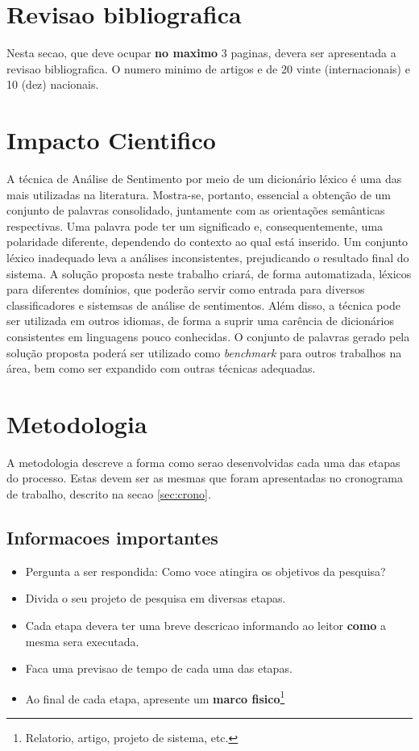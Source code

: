 \documentclass[a4paper,11pt]{article}
\begin{document}
\section{Revisao bibliografica}
Nesta secao, que deve ocupar \textbf{no maximo} 3 paginas, devera ser apresentada a revisao bibliografica. O numero minimo de artigos e de 20 vinte (internacionais) e 10 (dez) nacionais.

\section{Impacto Cientifico}
A técnica de Análise de Sentimento por meio de um dicionário léxico é uma das mais utilizadas na literatura. Mostra-se, portanto, essencial a obtenção de um conjunto de palavras consolidado, juntamente com as orientações semânticas respectivas. 
Uma palavra pode ter um significado e, consequentemente, uma polaridade diferente, dependendo do contexto ao qual está inserido. 
Um conjunto léxico inadequado leva a análises inconsistentes, prejudicando o resultado final do sistema.
A solução proposta neste trabalho criará, de forma automatizada, léxicos para diferentes domínios, que poderão servir como entrada para diversos classificadores e sistemsas de análise de sentimentos. Além disso, a técnica pode ser utilizada em outros idiomas, de forma a suprir uma carência de dicionários consistentes em linguagens pouco conhecidas.
O conjunto de palavras gerado pela solução proposta poderá ser utilizado como \emph{benchmark} para outros trabalhos na área, bem como ser expandido com outras técnicas adequadas.

\section{Metodologia}

A metodologia descreve a forma como serao desenvolvidas cada uma das etapas do processo. Estas devem ser as mesmas que foram apresentadas no cronograma de trabalho, descrito na secao \ref{sec:crono}.

\subsection{Informacoes importantes}
\begin{itemize}
\item{Pergunta a ser respondida: Como voce atingira os objetivos da pesquisa?}
\item{Divida o seu projeto de pesquisa em diversas etapas.}
\item{Cada etapa devera ter uma breve descricao informando ao leitor \textbf{como} a mesma sera executada.}
\item{Faca uma previsao de tempo de cada uma das etapas.}
\item{Ao final de cada etapa, apresente um \textbf{marco fisico}\footnote{Relatorio, artigo, projeto de sistema, etc.}}
\end{itemize}
\end{document}
